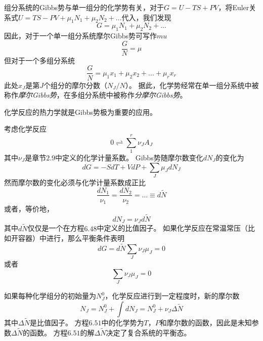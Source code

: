 组分系统的Gibbs势与单一组分的化学势有关，对于$G=U-TS+PV$，将Euler关系式$U=TS-PV+\mu_1N_1+\mu_2N_2+...$代入，我们发现
\begin{equation}
\label{equ6.43}
G=\mu_1N_1+\mu_2N_2+...
\end{equation}
因此，对于一个单一组分系统摩尔Gibbs势可写作$mu$
\begin{equation}
\label{equ6.44}
\frac{G}{N}=\mu
\end{equation}
但对于一个多组分系统
\begin{equation}
\label{equ6.45}
\frac{G}{N}=\mu_1x_1+\mu_2x_2+...+\mu_{r}x_{r}
\end{equation}
此处$x_J$是第$J$个组分的摩尔分数（$N_J/N$）。
据此，化学势经常在单一组分系统中被称作\emph{摩尔Gibbs势}，在多组分系统中被称作\emph{分摩尔Gibbs势}。

化学反应的热力学就是Gibbs势极为重要的应用。

考虑化学反应
\begin{equation}
\label{equ6.46}
0\rightleftharpoons \sum_{1}^{r}\nu_JA_J
\end{equation}
其中$\nu_J$是章节$2.9$中定义的化学计量系数。
Gibbs势随摩尔数变化$dN_J$的变化为
\begin{equation}
\label{equ6.47}
dG=-SdT+VdP+\sum_J \mu_J dN_J
\end{equation}
然而摩尔数的变化必须与化学计量系数成正比
\begin{equation}
\label{equ6.48}
\frac{dN_1}{\nu_1}=\frac{dN_2}{\nu_2}= \dots \equiv d\tilde{N}
\end{equation}
或者，等价地，
\begin{equation}
\label{equ6.49}
dN_J=\nu_J d\tilde{N}
\end{equation}
其中$d\tilde{N}$仅仅是一个在方程$6.48$中定义的比值因子。
如果化学反应在常温常压（比如开容器）中进行，那么平衡条件表明
\begin{equation}
\label{equ6.50}
dG=d\tilde{N}\sum_{J}\nu_{J}\mu_{J}=0
\end{equation}
或者
\begin{equation}
\label{equ6.51}
\sum_{J}\nu_{J}\mu_{J}=0
\end{equation}

如果每种化学组分的初始量为$N_J^0$，化学反应进行到一定程度时，新的摩尔数
\begin{equation}
\label{equ6.52}
N_J=N_J^0+\int dN_J=N_J^0+\nu_J \Delta\tilde{N}
\end{equation}
其中$\Delta\tilde{N}$是比值因子。
方程$6.51$中的化学势为$T$，$P$和摩尔数的函数，因此是未知参数$\Delta\tilde{N}$的函数。
方程$6.51$的解$\Delta\tilde{N}$决定了复合系统的平衡态。

